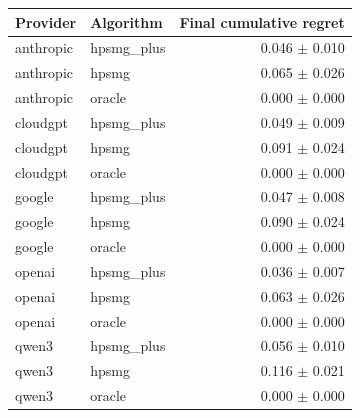 \begin{tabular}{llr}
Provider & Algorithm & Final cumulative regret \\
\hline
anthropic & hpsmg_plus & 0.046 $\pm$ 0.010 \\
anthropic & hpsmg & 0.065 $\pm$ 0.026 \\
anthropic & oracle & 0.000 $\pm$ 0.000 \\
cloudgpt & hpsmg_plus & 0.049 $\pm$ 0.009 \\
cloudgpt & hpsmg & 0.091 $\pm$ 0.024 \\
cloudgpt & oracle & 0.000 $\pm$ 0.000 \\
google & hpsmg_plus & 0.047 $\pm$ 0.008 \\
google & hpsmg & 0.090 $\pm$ 0.024 \\
google & oracle & 0.000 $\pm$ 0.000 \\
openai & hpsmg_plus & 0.036 $\pm$ 0.007 \\
openai & hpsmg & 0.063 $\pm$ 0.026 \\
openai & oracle & 0.000 $\pm$ 0.000 \\
qwen3 & hpsmg_plus & 0.056 $\pm$ 0.010 \\
qwen3 & hpsmg & 0.116 $\pm$ 0.021 \\
qwen3 & oracle & 0.000 $\pm$ 0.000 \\
\end{tabular}
